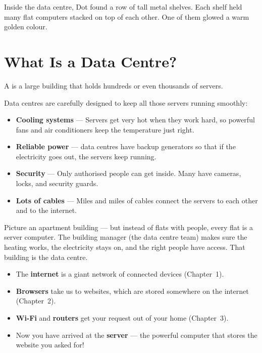 Inside the data centre, Dot found a row of tall metal shelves.
Each shelf held many flat computers stacked on top of each other.
One of them glowed a warm golden colour.


\sectionrule

\section*{What Is a Data Centre?}

A  is a large building that holds hundreds or even thousands of servers.

Data centres are carefully designed to keep all those servers running smoothly:

\begin{itemize}
  \item \textbf{Cooling systems} — Servers get very hot when they work hard, so powerful fans and air conditioners keep the temperature just right.
  \item \textbf{Reliable power} — data centres have backup generators so that if the electricity goes out, the servers keep running.
  \item \textbf{Security} — Only authorised people can get inside. Many have cameras, locks, and security guards.
  \item \textbf{Lots of cables} — Miles and miles of cables connect the servers to each other and to the internet.
\end{itemize}

\begin{picturethis}
  Picture an apartment building — but instead of flats with people,
  every flat is a server computer.
  The building manager (the data centre team) makes sure the heating works,
  the electricity stays on, and the right people have access.
  That building is the data centre.
\end{picturethis}

\sectionrule


\begin{tcolorbox}[enhanced,colback=SunYellow!12,colframe=SunYellow!70!black,arc=6pt,boxrule=1pt,
  fonttitle=\bfseries\large, title={\faRetweet\quad Remember So Far}]
  \begin{itemize}
    \item The \textbf{internet} is a giant network of connected devices (Chapter~1).
    \item \textbf{Browsers} take us to websites, which are stored somewhere on the internet (Chapter~2).
    \item \textbf{Wi-Fi} and \textbf{routers} get your request out of your home (Chapter~3).
    \item Now you have arrived at the \textbf{server} — the powerful computer that stores the website you asked for!
  \end{itemize}
\end{tcolorbox}

